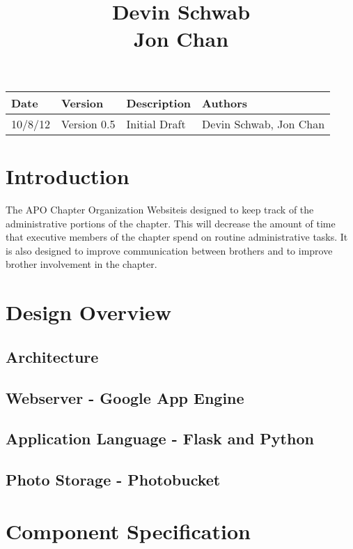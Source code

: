 \documentclass{article}
\title{\projName \\ \vspace{10 mm}
\docName \\ \vspace{10 mm}
Devin Schwab\\
Jon Chan}
\date{\docDate}
\newcommand{\projName}{APO Chapter Organization Website}
\begin{document}
\maketitle

\newpage

\begin{longtable}{|l|l|l|l|}
\hline
{\bf Date} & {\bf Version} & {\bf Description} & {\bf Authors} \\ \hline
10/8/12 & Version 0.5 & Initial Draft & Devin Schwab, Jon Chan \\ \hline
\end{longtable}

\newpage

\tableofcontents
\listoffigures

\newpage

\section{Introduction}
The \projName is designed to keep track of the administrative portions of the chapter. This will
decrease the amount of time that executive members of the chapter spend on routine administrative
tasks. It is also designed to improve communication between brothers and to improve brother
involvement in the chapter.

\section{Design Overview}

\subsection{Architecture}

\subsection{Webserver - Google App Engine}

\subsection{Application Language - Flask and Python}

\subsection{Photo Storage - Photobucket}

\section{Component Specification}
\end{document}
